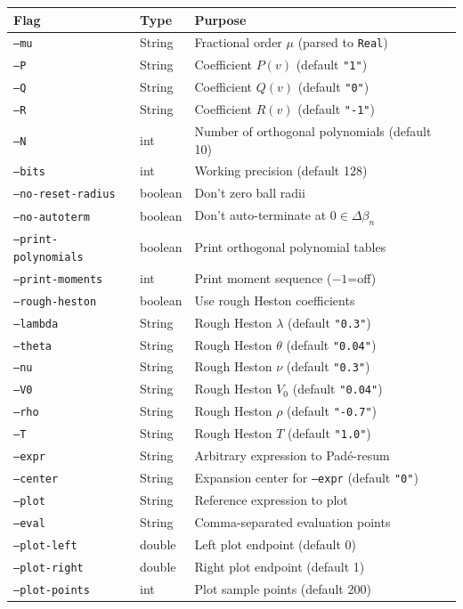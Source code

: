 \documentclass[a4paper,11pt]{article}
\begin{document}
\begin{tabularx}{\textwidth}{l l X}
\toprule
\textbf{Flag} & \textbf{Type} & \textbf{Purpose} \\
\midrule
\texttt{--mu} & String & Fractional order $\mu$ (parsed to \texttt{Real}) \\
\texttt{--P} & String & Coefficient $P(v)$ (default \texttt{"1"}) \\
\texttt{--Q} & String & Coefficient $Q(v)$ (default \texttt{"0"}) \\
\texttt{--R} & String & Coefficient $R(v)$ (default \texttt{"-1"}) \\
\texttt{--N} & int & Number of orthogonal polynomials (default 10) \\
\texttt{--bits} & int & Working precision (default 128) \\
\texttt{--no-reset-radius} & boolean & Don't zero ball radii \\
\texttt{--no-autoterm} & boolean & Don't auto-terminate at $0\in\Delta\beta_n$ \\
\texttt{--print-polynomials} & boolean & Print orthogonal polynomial tables \\
\texttt{--print-moments} & int & Print moment sequence ($-1$=off) \\
\texttt{--rough-heston} & boolean & Use rough Heston coefficients \\
\texttt{--lambda} & String & Rough Heston $\lambda$ (default \texttt{"0.3"}) \\
\texttt{--theta} & String & Rough Heston $\theta$ (default \texttt{"0.04"}) \\
\texttt{--nu} & String & Rough Heston $\nu$ (default \texttt{"0.3"}) \\
\texttt{--V0} & String & Rough Heston $V_0$ (default \texttt{"0.04"}) \\
\texttt{--rho} & String & Rough Heston $\rho$ (default \texttt{"-0.7"}) \\
\texttt{--T} & String & Rough Heston $T$ (default \texttt{"1.0"}) \\
\texttt{--expr} & String & Arbitrary expression to Pad\'e-resum \\
\texttt{--center} & String & Expansion center for \texttt{--expr} (default \texttt{"0"}) \\
\texttt{--plot} & String & Reference expression to plot \\
\texttt{--eval} & String & Comma-separated evaluation points \\
\texttt{--plot-left} & double & Left plot endpoint (default 0) \\
\texttt{--plot-right} & double & Right plot endpoint (default 1) \\
\texttt{--plot-points} & int & Plot sample points (default 200) \\
\bottomrule
\end{tabularx}
\end{document}
